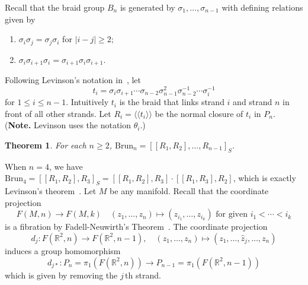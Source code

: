 \documentclass[10pt]{amsart}
\newtheorem{thm}{Theorem}[section]
\let\la=\langle
\let\ra=\rangle
\numberwithin{equation}{section}
\begin{document}
Recall that the braid group $B_n$ is generated by $\sigma_1,\ldots,\sigma_{n-1}$ with defining relations given by
\begin{enumerate}
\item $\sigma_i\sigma_j=\sigma_j\sigma_i$ for $|i-j|\geq 2$;
\item $\sigma_i\sigma_{i+1}\sigma_i=\sigma_{i+1}\sigma_i\sigma_{i+1}$.
\end{enumerate}
Following Levinson's notation in~\cite{Levinson2}, let
$$
t_i=\sigma_i\sigma_{i+1}\cdots\sigma_{n-2}\sigma_{n-1}^2\sigma_{n-2}^{-1}\cdots\sigma_i^{-1}
$$
for $1\leq i\leq n-1$. Intuitively $t_i$ is the braid that links strand $i$ and strand $n$ in front of all other strands. Let $R_i=\la\la t_i\ra\ra$ be the normal closure of $t_i$ in $P_n$. (\textbf{Note.} Levinson uses the notation $\theta_i$.)
\begin{thm}\label{theorem5.1}
For each $n\geq2$, ${\mathrm{Brun}}_n=[[R_1,R_2],\ldots,R_{n-1}]_S$.
\end{thm}
 When $n=4$, we have ${\mathrm{Brun}}_4=[[R_1,R_2],R_3]_S=[[R_1,R_2],R_3]\cdot [[R_1,R_3],R_2]$, which is exactly Levinson's theorem~\cite[Theorem 2]{Levinson2}. Let $M$ be any manifold. Recall that the coordinate projection
$$
F(M,n)\longrightarrow F(M,k)\quad (z_1,\ldots,z_n)\mapsto (z_{i_1},\ldots,z_{i_k}) \textrm{ for given } i_1<\cdots<i_k
$$
is a fibration by Fadell-Neuwirth's Theorem~\cite{FN}. The coordinate projection
$$
d_j\colon F({\ensuremath{\mathbb{R}}}^2,n)\longrightarrow F({\ensuremath{\mathbb{R}}}^2,n-1),\quad (z_1,\ldots,z_n)\mapsto (z_1,\ldots,\hat z_j,\ldots, z_n)$$ induces a group homomorphism
$$
d_{j*}\colon P_n=\pi_1(F({\ensuremath{\mathbb{R}}}^2,n))\longrightarrow P_{n-1}=\pi_1(F({\ensuremath{\mathbb{R}}}^2,n-1))
$$
which is given by removing the $j\,$th strand.
\end{document}
